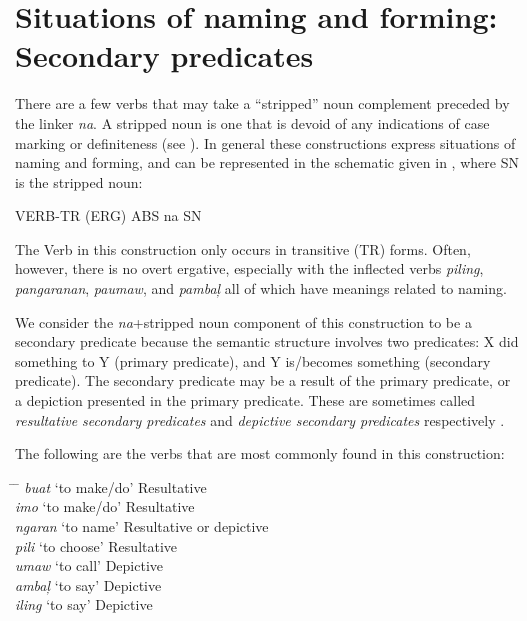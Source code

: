 \section{Situations of naming and forming: Secondary predicates}
\label{sec:secondarypredicates}

There are a few verbs that may take a “stripped” noun complement preceded by the linker \textit{na}. A stripped noun is one that is devoid of any indications of case marking or definiteness (see \cite{miner1986}). In general these constructions express situations of naming and forming, and can be represented in the schematic given in , where SN is the stripped noun:

\ea
\label{ex:secondarypredicatestemplate}
VERB-TR (ERG) ABS na SN
\z

The Verb in this construction only occurs in transitive (TR) forms. Often, however, there is no overt ergative, especially with the inflected verbs \textit{piling}, \textit{pangaranan}, \textit{paumaw}, and \textit{pambaļ} all of which have meanings related to naming.

We consider the \textit{na}+stripped noun component of this construction to be a secondary predicate because the semantic structure involves two predicates: X did something to Y (primary predicate), and Y is/becomes something (secondary predicate). The secondary predicate may be a result of the primary predicate, or a depiction presented in the primary predicate. These are sometimes called \textit{resultative secondary predicates} and \textit{depictive secondary predicates} respectively \citep{rothstein2012}.

The following are the verbs that are most commonly found in this construction: 

\ea
\begin{tabbing}
\hspace{1.5cm} \= \hspace{2cm} \= \kill  
\textit{buat} \> \textnormal{‘to make/do’} \>	\textnormal{Resultative} \\
\textit{imo} \> \textnormal{‘to make/do’} \>	\textnormal{Resultative} \\
\textit{ngaran} \> \textnormal{‘to name’} \>	\textnormal{Resultative or depictive} \\
\textit{pili} \> \textnormal{‘to choose’}	\>	\textnormal{Resultative} \\
\textit{umaw} \> \textnormal{‘to call’} 	\>	\textnormal{Depictive} \\
\textit{ambaļ} \> \textnormal{‘to say’} \>		\textnormal{Depictive} \\
\textit{iling} \> \textnormal{‘to say’} \> \textnormal{Depictive} \\
\end{tabbing}
\z

